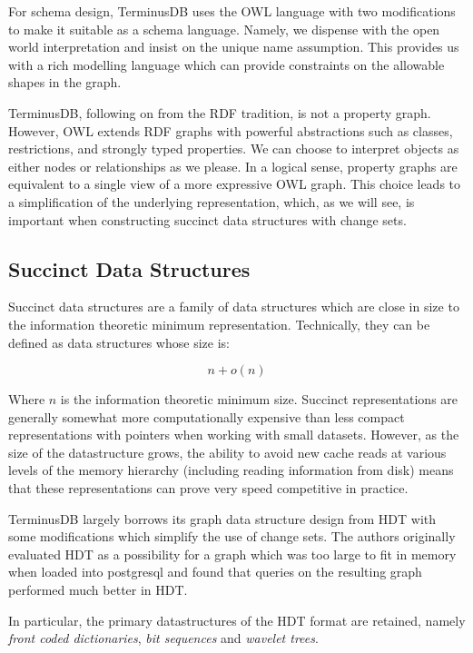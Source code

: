 \documentclass[10pt, a4paper, twocolumn]{article} %
\begin{document}
For schema design, TerminusDB uses the OWL language with two
modifications to make it suitable as a schema language. Namely, we
dispense with the open world interpretation and insist on the unique
name assumption\cite{DBLP:journals/semweb/FeeneyMB18}. This provides
us with a rich modelling language which can provide constraints on the
allowable shapes in the graph.

TerminusDB, following on from the RDF tradition, is not a property
graph. However, OWL extends RDF graphs with powerful abstractions such
as classes, restrictions, and strongly typed properties. We can choose
to interpret objects as either nodes or relationships as we please. In
a logical sense, property graphs are equivalent to a single view of a
more expressive OWL graph. This choice leads to a simplification of
the underlying representation, which, as we will see, is important
when constructing succinct data structures with change sets.

\subsection{Succinct Data Structures}

Succinct data structures\cite{Jacobson:1988:SSD:915547} are a family of
data structures which are close in size to the information theoretic
minimum representation. Technically, they can be defined as data structures
whose size is:

\[ n + o(n) \]

Where \(n\) is the information theoretic minimum size. Succinct
representations are generally somewhat more computationally expensive
than less compact representations with pointers when working with
small datasets. However, as the size of the datastructure grows, the
ability to avoid new cache reads at various levels of the memory
hierarchy (including reading information from disk) means that these
representations can prove very speed
competitive\cite{doi:10.1002/spe.2198} in practice.

TerminusDB largely borrows its graph data structure design from
HDT\cite{10.1007/978-3-642-30284-8_36} with some modifications which
simplify the use of change sets. The authors originally evaluated HDT
as a possibility for a graph which was too large to fit in memory when
loaded into postgresql and found that queries on the resulting graph
performed much better in HDT\cite{gleason_feeney2018}.

In particular, the primary datastructures of the HDT format are
retained, namely {\em front coded dictionaries}, {\em bit sequences}
and {\em wavelet trees}.
\end{document}
